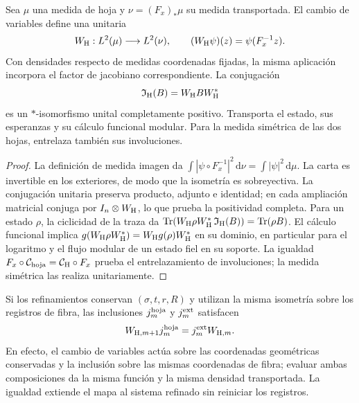 \begin{proposition}
\label{vii:vii:prop:transporte-unitario-horizonte}
Sea \(\mu\) una medida de hoja y \(\nu=(F_x)_*\mu\) su medida
transportada. El cambio de variables define una unitaria
\begin{equation}
 W_{\rm H}:L^2(\mu)\longrightarrow L^2(\nu),\qquad
 (W_{\rm H}\psi)(z)=\psi(F_x^{-1}z).
 \label{vii:vii:eq:unitaria-horizonte}
\end{equation}
Con densidades respecto de medidas coordenadas fijadas, la misma
aplicación incorpora el factor de jacobiano correspondiente.
La conjugación
\begin{equation}
 \mathfrak I_{\rm H}(B)=W_{\rm H}BW_{\rm H}^*
 \label{vii:vii:eq:mapa-observables-horizonte}
\end{equation}
es un \(*\)-isomorfismo unital completamente positivo. Transporta el
estado, sus esperanzas y su cálculo funcional modular. Para la medida
simétrica de las dos hojas, entrelaza también sus involuciones.
\end{proposition}
\begin{proof}
La definición de medida imagen da
\(\int|\psi\circ F_x^{-1}|^2\,\mathrm d\nu
=\int|\psi|^2\,\mathrm d\mu\).
La carta es invertible en los exteriores, de modo que la isometría es
sobreyectiva. La conjugación unitaria preserva producto, adjunto e
identidad; en cada ampliación matricial conjuga por
\(I_n\otimes W_{\rm H}\), lo que prueba la positividad completa.
Para un estado \(\rho\), la ciclicidad de la traza da
\(\operatorname{Tr}(W_{\rm H}\rho W_{\rm H}^*
\,\mathfrak I_{\rm H}(B))=\operatorname{Tr}(\rho B)\).
El cálculo funcional implica
\(g(W_{\rm H}\rho W_{\rm H}^*)=W_{\rm H}g(\rho)W_{\rm H}^*\)
en su dominio, en particular para el logaritmo y el flujo modular de
un estado fiel en su soporte. La igualdad
\(F_x\circ\mathcal C_{\rm hoja}=\mathcal C_{\rm H}\circ F_x\)
prueba el entrelazamiento de involuciones; la medida simétrica las realiza
unitariamente.
\end{proof}

Si los refinamientos conservan \((\sigma,t,r,R)\) y utilizan la misma
isometría sobre los registros de fibra, las inclusiones
\(j_m^{\rm hoja}\) y \(j_m^{\rm ext}\) satisfacen
\begin{equation}
 W_{{\rm H},m+1}j_m^{\rm hoja}
 =j_m^{\rm ext}W_{{\rm H},m}.
 \label{vii:vii:eq:naturalidad-horizonte}
\end{equation}
En efecto, el cambio de variables actúa sobre las coordenadas geométricas
conservadas y la inclusión sobre las mismas coordenadas de fibra; evaluar
ambas composiciones da la misma función y la misma densidad transportada.
La igualdad extiende el mapa al sistema refinado sin reiniciar los registros.

